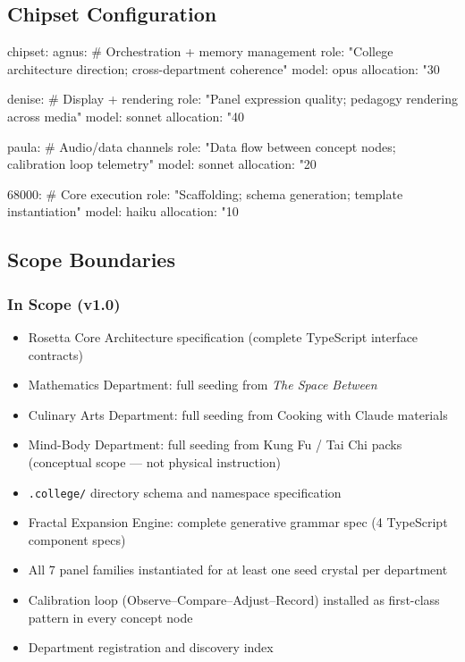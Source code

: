 \documentclass[11pt,letterpaper]{article}
\begin{document}
\subsection{Chipset Configuration}

\begin{asciibox}
chipset:
  agnus:    # Orchestration + memory management
    role: "College architecture direction; cross-department coherence"
    model: opus
    allocation: "30%

  denise:   # Display + rendering
    role: "Panel expression quality; pedagogy rendering across media"
    model: sonnet
    allocation: "40%

  paula:    # Audio/data channels
    role: "Data flow between concept nodes; calibration loop telemetry"
    model: sonnet
    allocation: "20%

  68000:    # Core execution
    role: "Scaffolding; schema generation; template instantiation"
    model: haiku
    allocation: "10%
\end{asciibox}

\subsection{Scope Boundaries}

\subsubsection{In Scope (v1.0)}
\begin{itemize}[leftmargin=1.5em]
  \item Rosetta Core Architecture specification (complete TypeScript interface contracts)
  \item Mathematics Department: full seeding from \textit{The Space Between}
  \item Culinary Arts Department: full seeding from Cooking with Claude materials
  \item Mind-Body Department: full seeding from Kung Fu / Tai Chi packs (conceptual scope --- not physical instruction)
  \item \texttt{.college/} directory schema and namespace specification
  \item Fractal Expansion Engine: complete generative grammar spec (4 TypeScript component specs)
  \item All 7 panel families instantiated for at least one seed crystal per department
  \item Calibration loop (Observe--Compare--Adjust--Record) installed as first-class pattern in every concept node
  \item Department registration and discovery index
\end{itemize}
\end{document}
